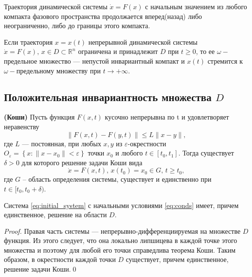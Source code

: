\documentclass[14pt,a4paper]{extarticle}
\begin{document}
	\begin{theorem}\cite{Arnold}\label{th:Arnold}
		Траектория динамической системы $\dot{x}=F(x)$ с начальным значением из любого компакта фазового пространства продолжается вперед(назад) либо неограниченно, либо до границы этого компакта.
	\end{theorem}
	
	\begin{theorem}\cite{Khalil}\label{th:Khalil}
		Если траектория $x=x(t)$ непрерывной динамической системы $\dot{x}=F(x),\, x\in D\subset\mathbb{R}^n$ ограничена и принадлежит $D$ при $t \ge 0$, то ее $\omega-$предельное множество --- непустой инвариантный компакт и $x(t)$ стремится к $\omega-$предельному множеству при $t\rightarrow+\infty$.
	\end{theorem}
	
	\subsection{Положительная инвариантность множества $D$}
	
	\begin{theorem}\textbf{(Коши)}
		Пусть функция $F(x, t)$ кусочно непрерывна по t и удовлетворяет неравенству
		\[\|F(x,t)-F(y,t)\|\le L\|x-y\|,\]
		где $L$ — постоянная, при любых $x, y$ из $\varepsilon$-окрестности $O_{\varepsilon} = \left\{x : \|x - x_0\| < \varepsilon\right\}$ точки $x_0$ и любого $t \in [t_0,t_1]$. Тогда существует $\delta > 0$ для которого решение задачи Коши вида 
		\[\dot{x}=F(x,t),\, x(t_0)=x_0\in G,\, t\ge t_0,\]
		где $G$ -- область определения системы, существует и единственно при \linebreak$ t\in[t_0,t_0+\delta)$. 
	\end{theorem}
	
	\begin{affirmation}
		 Система \ref{eq:initial_system} с начальными условиями \ref{eq:conds} имеет, причем единственное, решение на области $D$. 
	\end{affirmation}
	\begin{proof}
		Правая часть системы --- непрерывно-дифференциируемая на множестве $D$ функция. Из этого следует, что она локально липшицева в каждой точке этого множества и поэтому для любой его точки справедлива теорема Коши. Таким образом, в окрестности каждой точки $D$ существует, причем единственное, решение задачи Коши.\qed
	\end{proof}
	
\end{document}
